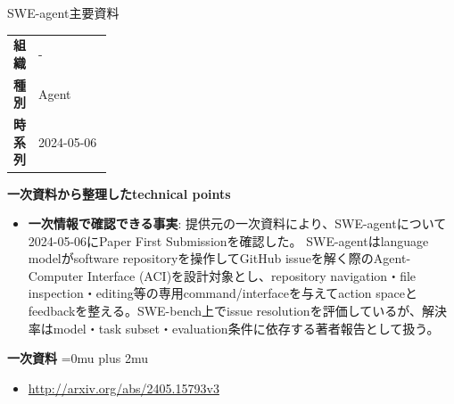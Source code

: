 \begin{technicalnote}{SWE-agent}{主要資料}
\begingroup
\begin{tabularx}{\linewidth}{@{}>{\bfseries}p{0.22\linewidth}X@{}}
組織 & - \\
種別 & Agent \\
時系列 & 2024-05-06 \\
\end{tabularx}
\smallskip
\begin{minipage}{\linewidth}
{\bfseries 一次資料から整理したtechnical points}
\begin{itemize}[leftmargin=1.5em,itemsep=0.35em]
\item \textbf{一次情報で確認できる事実}: 提供元の一次資料により、SWE-agentについて2024-05-06にPaper First Submissionを確認した。 SWE-agentはlanguage modelがsoftware repositoryを操作してGitHub issueを解く際のAgent-Computer Interface (ACI)を設計対象とし、repository navigation・file inspection・editing等の専用command/interfaceを与えてaction spaceとfeedbackを整える。SWE-bench上でissue resolutionを評価しているが、解決率はmodel・task subset・evaluation条件に依存する著者報告として扱う。
\end{itemize}
\begin{minipage}{\linewidth}
\begin{samepage}
{\bfseries 一次資料}
\begingroup\sloppy
\Urlmuskip=0mu plus 2mu\relax
\begin{itemize}[leftmargin=1.5em,itemsep=0.25em]
\item {\scriptsize\url{http://arxiv.org/abs/2405.15793v3}}
\end{itemize}
\endgroup
\end{samepage}
\end{minipage}
\end{minipage}
\endgroup
\end{technicalnote}
\medskip

